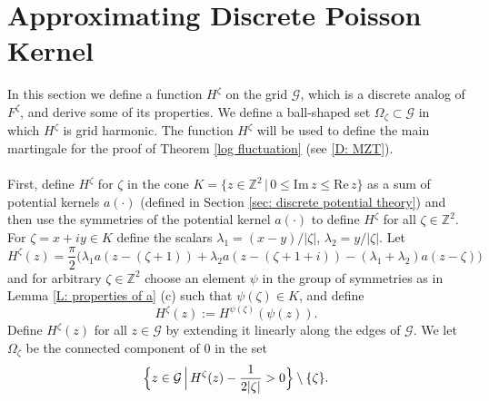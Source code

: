 \documentclass[11pt]{article}
\numberwithin{equation}{section}
\def\OZ{\Omega_{\zeta}}
\def\mydot{\boldsymbol{\cdot}}
\begin{document}
\section{Approximating Discrete Poisson Kernel}
\label{sec: define H}
In this section we define a function $H^{\zeta}$ on the grid $\mathcal{G}$, 
which is a discrete analog of $F^{\zeta}$, and derive some of its properties. 
We define a ball-shaped set $\OZ \subset \mathcal{G}$ in which 
$H^{\zeta}$ is grid harmonic. 
The function $H^{\zeta}$ will be used to define the main martingale for the proof 
of Theorem \ref{log fluctuation} (see \eqref{D: MZT}).
\\~\\
First, define $H^{\zeta}$ for $\zeta$ in the cone 
$K = \{z \in \mathbb{Z}^2 \,|\, 0 \leq \text{Im} \, z \leq \text{Re}\, z\}$ 
as a sum of potential kernels $a(\mydot)$ (defined in Section \ref{sec: discrete potential theory})
and then use the symmetries of the potential kernel $a(\mydot)$ 
to define $H^{\zeta}$ for all $\zeta \in \mathbb{Z}^2$.  
For $\zeta = x+iy \in K$ define the scalars $\lambda_1 = (x-y)/|\zeta|$,  
$\lambda_2 = y /|\zeta|$. Let
\begin{equation}
  \label{D: H zeta}
    H^{\zeta}(z) = \frac{\pi}{2} 
      \big( \lambda_1 a(z- (\zeta+1)) 
            +\lambda_2 a(z-(\zeta + 1+ i)) 
            -(\lambda_1 + \lambda_2) a(z-\zeta) \big)
\end{equation}
and for arbitrary $\zeta \in \mathbb{Z}^2$
choose an element $\psi$ in the group of 
symmetries as in Lemma \ref{L: properties of a} (c) such that 
 $\psi (\zeta) \in K$, and define 
\begin{equation}\label{eq: symmetries of H^zeta}
  H^{\zeta}(z) := H^{\psi(\zeta)}(\psi (z)).
\end{equation}
Define $H^{\zeta}(z)$ for all $z \in \mathcal{G}$ 
by extending it linearly along the edges of $\mathcal{G}$.
We let $\Omega_{\zeta}$ be the connected component of $0$ in the set 
\begin{equation}
  \label{D: OZ}
  \nonumber
  \Big{\{} z \in \mathcal{G} \, \Big|\, 
    H^{\zeta}(z) - \frac{1}{2|\zeta|} > 0 \Big{\}} \setminus \{\zeta\}.
\end{equation}
\end{document}
